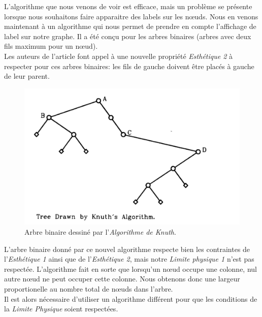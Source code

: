 \documentclass{article}
\begin{document}
    L'algorithme que nous venons de voir est efficace, mais un problème se présente lorsque nous souhaitons faire apparaitre des labels sur les n\oe{}uds. Nous en venons maintenant à un algorithme qui nous permet de prendre en compte l'affichage de label sur notre graphe. Il a été conçu pour les arbres binaires (arbres avec deux fils maximum pour un n\oe{}ud).\\

    Les auteurs de l'article \cite{article79} font appel à une nouvelle propriété \emph{Esthétique 2} à respecter pour ces arbres binaires: les fils de gauche doivent être placés à gauche de leur parent.\\

    \vfill
    \begin{figure}[h]
    		\begin{center}
    			\includegraphics[scale=0.4]{arbreBinaire.png}
    		\end{center}
    	\caption{Arbre binaire dessiné par l'\emph{Algorithme de Knuth}. \cite{article79}}
      \label{fig:arbreBinaire}
    \end{figure}
    \vfill

    L'arbre binaire donné par ce nouvel algorithme respecte bien les contraintes de l'\emph{Esthétique 1} ainsi que de l'\emph{Esthétique 2}, mais notre \emph{Limite physique 1} n'est pas respectée. L'algorithme fait en sorte que lorsqu’un n\oe{}ud occupe une colonne, nul autre n\oe{}ud ne peut occuper cette colonne. Nous obtenons donc une largeur proportionelle au nombre total de n\oe{}uds dans l'arbre.\\

    Il est alors nécessaire d'utiliser un algorithme différent pour que les conditions de la \emph{Limite Physique} soient respectées.\\
\end{document}
